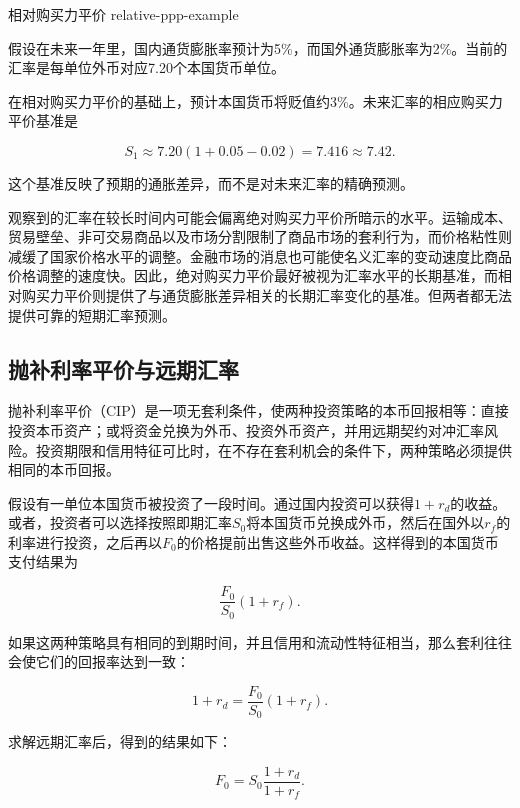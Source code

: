 \begin{example}{相对购买力平价}
{relative-ppp-example}

假设在未来一年里，国内通货膨胀率预计为5\%，而国外通货膨胀率为2\%。当前的汇率是每单位外币对应7.20个本国货币单位。

在相对购买力平价的基础上，预计本国货币将贬值约3\%。未来汇率的相应购买力平价基准是

\[
S_1
\approx
7.20(1+0.05-0.02)
=
7.416
\approx 7.42.
\]

这个基准反映了预期的通胀差异，而不是对未来汇率的精确预测。

\end{example}

观察到的汇率在较长时间内可能会偏离绝对购买力平价所暗示的水平。运输成本、贸易壁垒、非可交易商品以及市场分割限制了商品市场的套利行为，而价格粘性则减缓了国家价格水平的调整。金融市场的消息也可能使名义汇率的变动速度比商品价格调整的速度快。因此，绝对购买力平价最好被视为汇率水平的长期基准，而相对购买力平价则提供了与通货膨胀差异相关的长期汇率变化的基准。但两者都无法提供可靠的短期汇率预测。


\subsection{抛补利率平价与远期汇率}

抛补利率平价（CIP）是一项无套利条件，使两种投资策略的本币回报相等：直接投资本币资产；或将资金兑换为外币、投资外币资产，并用远期契约对冲汇率风险。投资期限和信用特征可比时，在不存在套利机会的条件下，两种策略必须提供相同的本币回报。

假设有一单位本国货币被投资了一段时间。通过国内投资可以获得$1+r_d$的收益。或者，投资者可以选择按照即期汇率$S_0$将本国货币兑换成外币，然后在国外以$r_f$的利率进行投资，之后再以$F_0$的价格提前出售这些外币收益。这样得到的本国货币支付结果为

\begin{equation*}
\frac{F_0}{S_0}(1+r_f).
\label{eq:ch10-cip-foreign-payoff}
\end{equation*}

如果这两种策略具有相同的到期时间，并且信用和流动性特征相当，那么套利往往会使它们的回报率达到一致：

\begin{equation*}
1+r_d
=
\frac{F_0}{S_0}(1+r_f).
\label{eq:ch10-cip}
\end{equation*}

求解远期汇率后，得到的结果如下：

\begin{equation}
F_0
=S_0\frac{1+r_d}{1+r_f}.
\label{eq:ch10-forward-from-cip}
\end{equation}

